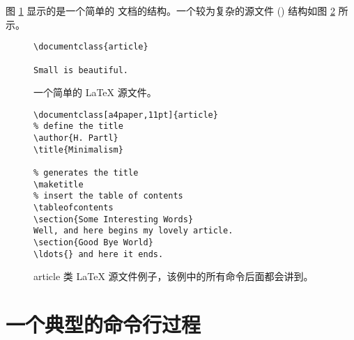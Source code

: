 
图 \ref{mini} 显示的是一个简单的 \LaTeXe 文档的结构。一个较为复杂的源文件 () 结构如图 \ref{document} 所示。

\begin{figure}[!bp]
\begin{lined}{6cm}
\begin{verbatim}
\documentclass{article}

Small is beautiful.

\end{verbatim}
\end{lined}
\caption{一个简单的 \LaTeX{} 源文件。} \label{mini}
\end{figure}

\begin{figure}[!bp]
\begin{lined}{10cm}
\begin{verbatim}
\documentclass[a4paper,11pt]{article}
% define the title
\author{H. Partl}
\title{Minimalism}

% generates the title
\maketitle
% insert the table of contents
\tableofcontents
\section{Some Interesting Words}
Well, and here begins my lovely article.
\section{Good Bye World}
\ldots{} and here it ends.

\end{verbatim}
\end{lined}
\caption[article 类例子。]{article 类 \LaTeX{} 源文件例子，该例中的所有命令后面都会讲到。}
\label{document}

\end{figure}

\section{一个典型的命令行过程}

